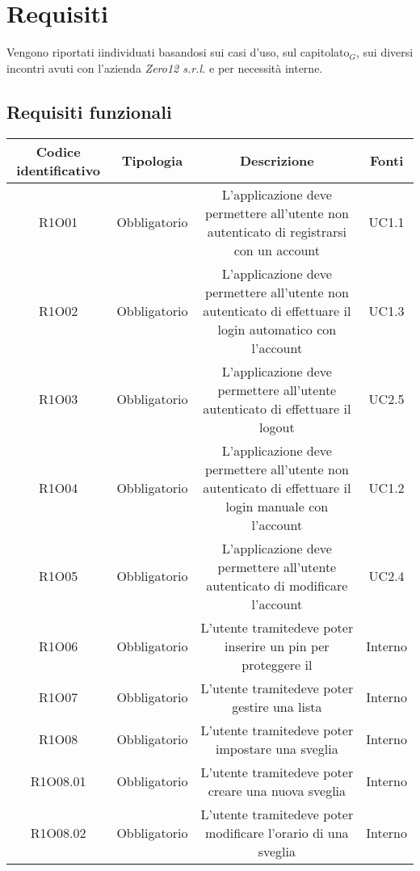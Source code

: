 \chapter{Requisiti}
Vengono riportati iindividuati basandosi sui casi d'uso, sul capitolato$_{G}$, sui diversi incontri avuti con l'azienda \textit{Zero12 s.r.l.} e per necessità interne. \\


\newpage
\section{Requisiti funzionali}
\begin{tabularx}{\textwidth}{|C|C|C|C|}
	\hline
     \textbf{Codice identificativo} & \textbf{Tipologia} & \textbf{Descrizione} & \textbf{Fonti} \\
    \hline
	\endhead
	R1O01& Obbligatorio &L'applicazione deve permettere all'utente non autenticato di registrarsi con un account& UC1.1	\\
	\hline
	R1O02& Obbligatorio &L'applicazione deve permettere all'utente non autenticato di effettuare il login automatico con l'account & UC1.3\\
	\hline
	R1O03& Obbligatorio &L'applicazione deve permettere all'utente autenticato di  effettuare il logout & UC2.5\\
	\hline
	R1O04& Obbligatorio &L'applicazione deve permettere all'utente non autenticato di effettuare il login manuale con l'account& UC1.2\\
	\hline
	R1O05& Obbligatorio&L'applicazione deve permettere all'utente autenticato di modificare l'account& UC2.4\\
	\hline
	R1O06& Obbligatorio&L'utente tramitedeve poter inserire un pin per proteggere il & Interno \\
	\hline
	R1O07& Obbligatorio & L'utente tramitedeve poter gestire una lista& Interno\\
	\hline
	R1O08& Obbligatorio &L'utente tramitedeve poter impostare una sveglia &Interno\\
	\hline
	R1O08.01 & Obbligatorio & L'utente tramitedeve poter creare una nuova sveglia &Interno\\
	\hline
	R1O08.02 & Obbligatorio & L'utente tramitedeve poter modificare l'orario di una sveglia &Interno\\

\end{tabularx}
